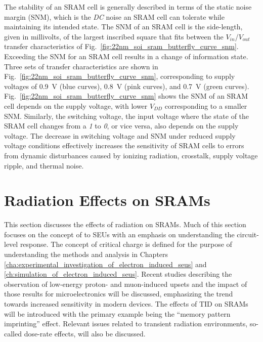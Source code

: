 The stability of an SRAM cell is generally described in terms of the static noise margin (SNM), which is the \emph{DC} noise an SRAM cell can tolerate while maintaining its intended state.
The SNM of an SRAM cell is the side-length, given in millivolts, of the largest inscribed square that fits between the $V_{in}$/$V_{out}$transfer characteristics of Fig.~\ref{fig:22nm_soi_sram_butterfly_curve_snm}.
Exceeding the SNM for an SRAM cell results in a change of information state.
Three sets of transfer characteristics are shown in Fig.~\ref{fig:22nm_soi_sram_butterfly_curve_snm}, corresponding to supply voltages of 0.9~V (blue curves), 0.8~V (pink curves), and 0.7~V (green curves).
Fig.~\ref{fig:22nm_soi_sram_butterfly_curve_snm} shows the SNM of an SRAM cell depends on the supply voltage, with lower $V_{DD}$ corresponding to a smaller SNM.
Similarly, the switching voltage, the input voltage where the state of the SRAM cell changes from a \emph{1} to \emph{0}, or vice versa, also depends on the supply voltage.
The decrease in switching voltage and SNM under reduced supply voltage conditions effectively increases the sensitivity of SRAM cells to errors from dynamic disturbances caused by ionizing radiation, crosstalk, supply voltage ripple, and thermal noise.

\section{Radiation Effects on SRAMs} %
\label{sec:radiation_effects_on_sram}
This section discusses the effects of radiation on SRAMs. 
Much of this section focuses on the concept of to SEUs with an emphasis on understanding the circuit-level response.
The concept of critical charge is defined for the purpose of understanding the methods and analysis in Chapters \ref{cha:experimental_investigation_of_electron_induced_seus} and \ref{ch:simulation_of_electron_induced_seus}.
Recent studies describing the observation of low-energy proton- and muon-induced upsets and the impact of those results for microelectronics will be discussed, emphasizing the trend towards increased sensitivity in modern devices. 
The effects of TID on SRAMs will be introduced with the primary example being the ``memory pattern imprinting'' effect. 
Relevant issues related to transient radiation environments, so-called dose-rate effects, will also be discussed.

